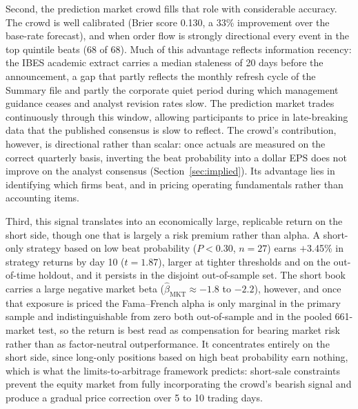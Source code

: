 \documentclass[11pt]{article}
\begin{document}
Second, the prediction market crowd fills that role with considerable accuracy. The crowd is well calibrated (Brier score 0.130, a 33\% improvement over the base-rate forecast), and when order flow is strongly directional every event in the top quintile beats (68 of 68). Much of this advantage reflects information recency: the IBES academic extract carries a median staleness of 20 days before the announcement, a gap that partly reflects the monthly refresh cycle of the Summary file and partly the corporate quiet period during which management guidance ceases and analyst revision rates slow. The prediction market trades continuously through this window, allowing participants to price in late-breaking data that the published consensus is slow to reflect. The crowd's contribution, however, is directional rather than scalar: once actuals are measured on the correct quarterly basis, inverting the beat probability into a dollar EPS does not improve on the analyst consensus (Section~\ref{sec:implied}). Its advantage lies in identifying which firms beat, and in pricing operating fundamentals rather than accounting items.

Third, this signal translates into an economically large, replicable return on the short side, though one that is largely a risk premium rather than alpha. A short-only strategy based on low beat probability ($P < 0.30$, $n = 27$) earns $+$3.45\% in strategy returns by day 10 ($t = 1.87$), larger at tighter thresholds and on the out-of-time holdout, and it persists in the disjoint out-of-sample set. The short book carries a large negative market beta ($\hat\beta_{\text{MKT}}\approx-1.8$ to $-2.2$), however, and once that exposure is priced the Fama--French alpha is only marginal in the primary sample and indistinguishable from zero both out-of-sample and in the pooled 661-market test, so the return is best read as compensation for bearing market risk rather than as factor-neutral outperformance. It concentrates entirely on the short side, since long-only positions based on high beat probability earn nothing, which is what the limits-to-arbitrage framework predicts: short-sale constraints prevent the equity market from fully incorporating the crowd's bearish signal and produce a gradual price correction over 5 to 10 trading days.
\end{document}
